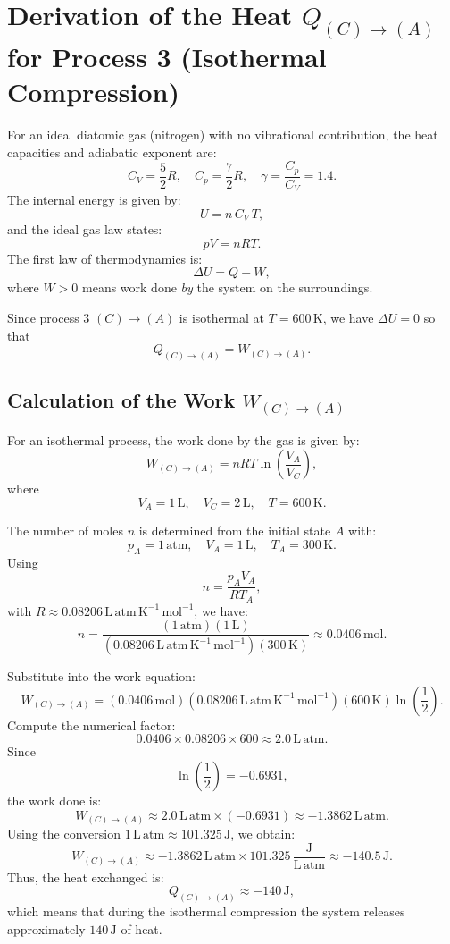 \documentclass[12pt]{article}
\theoremstyle{definition} %
\theoremstyle{plain} %
\begin{document}
\section*{Derivation of the Heat \(Q_{(C)\to(A)}\) for Process 3 (Isothermal Compression)}

For an ideal diatomic gas (nitrogen) with no vibrational contribution, the heat capacities and adiabatic exponent are:
\[
C_V = \frac{5}{2}R,\quad C_p = \frac{7}{2}R,\quad \gamma = \frac{C_p}{C_V} = 1.4.
\]
The internal energy is given by:
\[
U = n\,C_V\,T,
\]
and the ideal gas law states:
\[
pV = nRT.
\]
The first law of thermodynamics is:
\[
\Delta U = Q - W,
\]
where \(W>0\) means work done \emph{by} the system on the surroundings.

Since process 3 \((C)\to(A)\) is isothermal at \(T = 600\,\mathrm{K}\), we have \(\Delta U=0\) so that
\[
Q_{(C)\to(A)} = W_{(C)\to(A)}.
\]

\subsection*{Calculation of the Work \(W_{(C)\to(A)}\)}

For an isothermal process, the work done by the gas is given by:
\[
W_{(C)\to(A)} = nRT \ln\!\left(\frac{V_A}{V_C}\right),
\]
where
\[
V_A = 1\,\mathrm{L},\quad V_C = 2\,\mathrm{L},\quad T = 600\,\mathrm{K}.
\]

The number of moles \(n\) is determined from the initial state \(A\) with:
\[
p_A = 1\,\mathrm{atm},\quad V_A = 1\,\mathrm{L},\quad T_A = 300\,\mathrm{K}.
\]
Using
\[
n = \frac{p_A V_A}{RT_A},
\]
with \(R \approx 0.08206\,\mathrm{L\,atm\,K^{-1}\,mol^{-1}}\), we have:
\[
n = \frac{(1\,\mathrm{atm})(1\,\mathrm{L})}{(0.08206\,\mathrm{L\,atm\,K^{-1}\,mol^{-1}})(300\,\mathrm{K})} \approx 0.0406\,\mathrm{mol}.
\]

Substitute into the work equation:
\[
W_{(C)\to(A)} = (0.0406\,\mathrm{mol})(0.08206\,\mathrm{L\,atm\,K^{-1}\,mol^{-1}})(600\,\mathrm{K}) \ln\!\left(\frac{1}{2}\right).
\]
Compute the numerical factor:
\[
0.0406 \times 0.08206 \times 600 \approx 2.0\,\mathrm{L\,atm}.
\]
Since
\[
\ln\!\left(\frac{1}{2}\right) = -0.6931,
\]
the work done is:
\[
W_{(C)\to(A)} \approx 2.0\,\mathrm{L\,atm} \times (-0.6931) \approx -1.3862\,\mathrm{L\,atm}.
\]
Using the conversion \(1\,\mathrm{L\,atm} \approx 101.325\,\mathrm{J}\), we obtain:
\[
W_{(C)\to(A)} \approx -1.3862\,\mathrm{L\,atm} \times 101.325\,\frac{\mathrm{J}}{\mathrm{L\,atm}} \approx -140.5\,\mathrm{J}.
\]
Thus, the heat exchanged is:
\[
\boxed{Q_{(C)\to(A)} \approx -140\,\mathrm{J}},
\]
which means that during the isothermal compression the system releases approximately \(140\,\mathrm{J}\) of heat.
\end{document}
